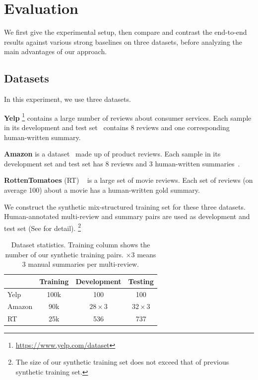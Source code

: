 \section{Evaluation}
\label{sec:eval}
We first give the experimental setup, then
compare and contrast the end-to-end results against various
strong baselines on three datasets,
before analyzing the main advantages of our approach.

\subsection{Datasets}
In this experiment, we use three datasets.

\textbf{Yelp} 
\footnote{\url{https://www.yelp.com/dataset}}
contains a large number of reviews about consumer services. 
Each sample in its development and test set~\cite{MeanSum19} contains 8 reviews and one corresponding human-written summary.

\textbf{Amazon} 
is a dataset~\cite{HeM16} 
made up of product reviews. 
Each sample in its development set and test set has 8 reviews and 3 human-written summaries~\cite{Copycat20}. 

\textbf{RottenTomatoes} (RT) ~\cite{RT16}
is a large set of movie reviews. Each set of reviews (on average 100) about a
movie has a human-written gold summary. 

We construct the synthetic mix-structured training set for these three datasets.
Human-annotated multi-review and summary pairs
are used as development and test set
(See  for detail).  
\footnote{The size of our synthetic training set does not exceed that of previous synthetic training set.
} %

\begin{table}[th]
	\scriptsize
	\centering
	\begin{tabular}{|l|c|c|c|}
		\hline
		\textbf{} & \textbf{Training} &\textbf{Development} & \textbf{Testing}\\
		\hline
		Yelp & 100k & 100 & 100 \\
		Amazon & 90k & $28\times3$ & $32\times3$ \\
		RT & 25k& 536 & 737\\
		\hline
	\end{tabular}
	\caption{%
		Dataset statistics.
	    Training column shows the number of our synthetic training pairs.
		$\times3$ means 3 manual summaries per multi-review.}
	\label{tab:datasets}
\end{table}

